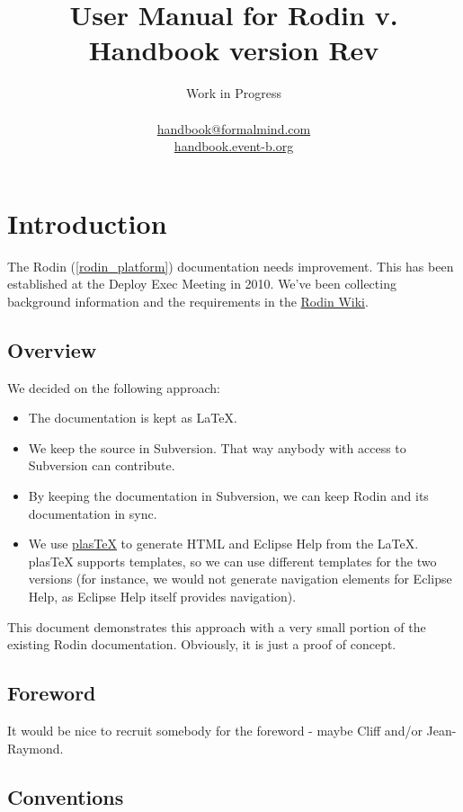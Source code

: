 \documentclass{book}
\title{User Manual for Rodin v.\versionnr\\
Handbook version $ $Rev$ $}
\author{Work in Progress\\ \\
\href{mailto:handbook@formalmind.com}{handbook@formalmind.com}\\
\href{http://handbook.event-b.org}{handbook.event-b.org}}
\begin{document}
        

\maketitle

\chapter{Introduction}

The Rodin (\ref{rodin_platform}) documentation needs improvement.  This has been established at the Deploy Exec Meeting in 2010.  We've been collecting background information and the requirements in the \href{http://wiki.event-b.org/index.php/User_Documentation_Overhaul}{Rodin Wiki}.

\section{Overview}

We decided on the following approach:

\begin{itemize}
\item The documentation is kept as \LaTeX.
\item We keep the source in Subversion.  That way anybody with access to Subversion can contribute.
\item By keeping the documentation in Subversion, we can keep Rodin and its documentation in sync.
\item We use \href{http://plastex.sourceforge.net/}{plasTeX} to generate HTML and Eclipse Help from the \LaTeX.  plasTeX supports templates, so we can use different templates for the two versions (for instance, we would not generate navigation elements for Eclipse Help, as Eclipse Help itself provides navigation).
\end{itemize}

This document demonstrates this approach with a very small portion of the existing Rodin documentation.  Obviously, it is just a proof of concept.

\section{Foreword}

It would be nice to recruit somebody for the foreword - maybe Cliff and/or Jean-Raymond.

\section{Conventions}
\label{conventions}
\end{document}
